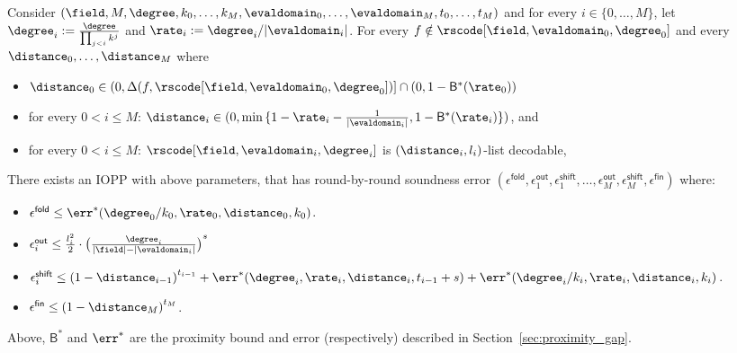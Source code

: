 \begin{lemma}\label{lemma:rnd_by_rnd_soundness}
    Consider $(\field,M,\degree,k_0,\ldots,k_M,\evaldomain_0,\ldots,\evaldomain_M,t_0,\ldots,t_M)$ and for every $i\in\{0,\ldots,M\}$, let $\degree_i:=\frac{\degree}{\prod_{j<i}k^j}$ and $\rate_i:=\degree_i/|\evaldomain_i|$. For every $f\notin\rscode[\field,\evaldomain_0,\degree_0]$ and every $\distance_0,\ldots,\distance_M$ where
    \begin{itemize}
        \item $\distance_0\in(0,\Delta(f,\rscode[\field,\evaldomain_0,\degree_0])]\cap(0,1-{\mathsf{B}}^*(\rate_0))$
        \item for every $0<i\leq M$: $\distance_i\in(0,\min{\{1-\rate_i-\frac{1}{|\evaldomain_i|},1-{\mathsf{B}^*(\rate_i)}\}})$, and
        \item for every $0<i\leq M$: $\rscode[\field,\evaldomain_i,\degree_i]$ is $(\distance_i,l_i)$-list decodable,
    \end{itemize}
    There exists an IOPP with above parameters, that has round-by-round soundness error $(\epsilon^{\mathsf{fold}},\epsilon^{\mathsf{out}}_1,\epsilon^{\mathsf{shift}}_1,\ldots,\epsilon^{\mathsf{out}}_M,\epsilon^{\mathsf{shift}}_M,\epsilon^{\mathsf{fin}})$ where:
    \begin{itemize}
        \item $\epsilon^{\mathsf{fold}}\leq\err^*(\degree_0/k_0,\rate_0,\distance_0,k_0)$.
        \item $\epsilon^{\mathsf{out}}_i\leq\frac{l^2_i}{2}\cdot{\big(\frac{\degree_i}{|\field|-|\evaldomain_i|}\big)}^s$
        \item $\epsilon^{\mathsf{shift}}_i\leq {(1-\distance_{i-1})}^{t_{i-1}}+\err^*(\degree_i,\rate_i,\distance_i,t_{i-1}+s)+\err^*(\degree_i/k_i,\rate_i,\distance_i,k_i)$.
        \item $\epsilon^{\mathsf{fin}}\leq{(1-\distance_M)}^{t_M}$.
    \end{itemize}
    Above, ${\mathsf{B}}^*$ and ${\err}^*$ are the proximity bound and error (respectively) described in Section~\ref{sec:proximity_gap}.
\end{lemma}
